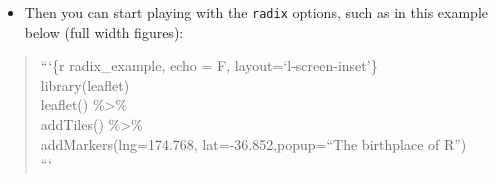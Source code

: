\documentclass[]{article}
\providecommand{\tightlist}{%
  \setlength{\itemsep}{0pt}\setlength{\parskip}{0pt}}
\begin{document}
\begin{itemize}
\tightlist
\item
  Then you can start playing with the \texttt{radix} options, such as in
  this example below (full width figures):
\end{itemize}

\begin{quote}
```\{r radix\_example, echo = F, layout=`l-screen-inset'\}\\
library(leaflet)\\
leaflet() \%\textgreater{}\%\\
addTiles() \%\textgreater{}\%\\
addMarkers(lng=174.768, lat=-36.852,popup=``The birthplace of R'')\\
```
\end{quote}
\end{document}
